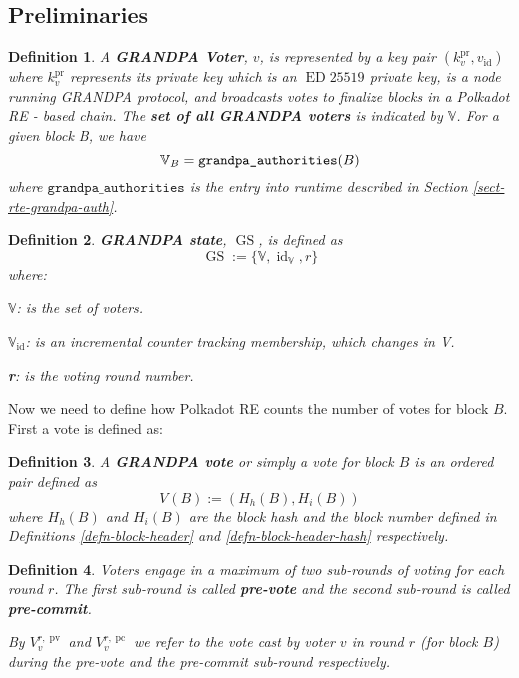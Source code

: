 \documentclass{book}
\newcommand{\assign}{:=}
\newcommand{\nosymbol}{}
\newcommand{\tmop}[1]{\ensuremath{\operatorname{#1}}}
\newcommand{\tmstrong}[1]{\textbf{#1}}
\newcommand{\tmtextbf}[1]{{\bfseries{#1}}}
\newcommand{\tmtexttt}[1]{{\ttfamily{#1}}}
\newcommand{\tmverbatim}[1]{{\ttfamily{#1}}}
\newtheorem{definition}{Definition}
\providecommand{\nosymbol}{}
\providecommand{\tmop}[1]{\ensuremath{\mathrm{#1}}}
\providecommand{\tmstrong}[1]{\tmtextbf{#1}}
\providecommand{\tmtextbf}[1]{\tmtextbf{#1}}
\providecommand{\tmverbatim}[1]{\tmtexttt{#1}}
\newtheorem{definition}{Definition}
\begin{document}
\subsection{Preliminaries}

\begin{definition}
  A {\tmstrong{GRANDPA Voter}}, $v$, is represented by a key pair
  $(k^{\tmop{pr}}_v, v_{\tmop{id}})$ where $k_v^{\tmop{pr}}$ represents its
  private key which is an $\tmop{ED} 25519$ private key, is a node running
  GRANDPA protocol, and broadcasts votes to finalize blocks in a Polkadot RE -
  based chain. The {\tmstrong{set of all GRANDPA voters}} is indicated by
  $\mathbb{V}$. For a given block B, we have
  \[ \mathbb{V}_B = \text{\tmverbatim{grandpa\_authorities}} (B) \]
  where $\mathtt{grandpa\_authorities}$ is the entry into runtime described in
  Section \ref{sect-rte-grandpa-auth}.
\end{definition}

\begin{definition}
  {\tmstrong{GRANDPA state}}, $\tmop{GS}$, is defined as
  \[ \tmop{GS} \assign \{\mathbb{V}, \tmop{id}_{\mathbb{V}}, r\} \]
  where:
  
  $\mathbb{V}$: is the set of voters.
  
  {\tmstrong{$\mathbb{V}_{\tmop{id}}$}}: is an incremental counter tracking
  \tmverbatim{}membership, which changes in V.
  
  {\tmstrong{r}}: is the votin\tmverbatim{}g round number.
\end{definition}

Now we need to define how Polkadot RE counts the number of votes for block
$B$. First a vote is defined as:

\begin{definition}
  \label{defn-vote}A {\tmstrong{GRANDPA vote }}or simply a vote for block $B$
  is an ordered pair defined as
  \[ V_{\nosymbol} (B) \assign (H_h (B), H_i (B)) \]
  where $H_h (B)$ and $H_i (B)$ are the block hash and the block number
  defined in Definitions \ref{defn-block-header} and
  \ref{defn-block-header-hash} respectively.
\end{definition}

\begin{definition}
  Voters engage in a maximum of two sub-rounds of voting for each round $r$.
  The first sub-round is called {\tmstrong{pre-vote}} and\tmverbatim{} the
  second sub-round is called {\tmstrong{pre-commit}}.
  
  By {\tmstrong{$V_v^{r, \tmop{pv}}$}} and {\tmstrong{$V_v^{r, \tmop{pc}}$}}
  we refer to the vote cast by voter $v$ in round $r$ (for block $B$) during
  the pre-vote and the pre-commit sub-round respectively.
\end{definition}
\end{document}
